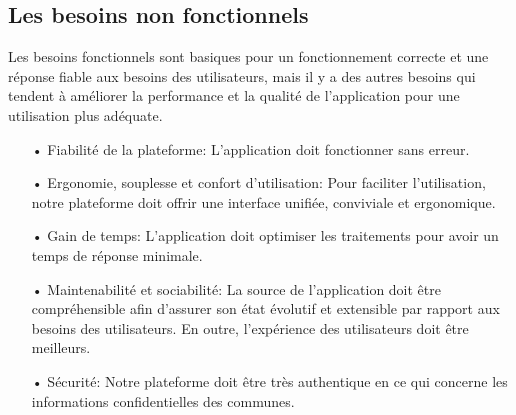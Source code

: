 \documentclass[a4paper]{report}
\begin{document}
\begin{doublespace}
	\subsection{Les besoins non fonctionnels}
	Les besoins fonctionnels sont basiques pour un fonctionnement
	correcte et une réponse fiable aux besoins des utilisateurs, mais il y a des
	autres besoins qui tendent à améliorer la performance et la qualité de
	l'application pour une utilisation plus adéquate.
	\begin{itemize}
		\item[•] Fiabilité de la plateforme: L’application doit
		      fonctionner sans erreur.
		\item[•] Ergonomie, souplesse et confort d’utilisation: Pour
		      faciliter l’utilisation, notre plateforme doit offrir une interface unifiée,
		      conviviale et ergonomique.
		\item[•] Gain de temps: L'application doit optimiser les
		      traitements pour avoir un temps de réponse minimale.
		\item[•] Maintenabilité et sociabilité: La source de l'application doit être compréhensible
		      afin d’assurer son état évolutif et extensible par rapport aux besoins des utilisateurs. En outre, l’expérience des utilisateurs doit être meilleurs.
		\item[•] Sécurité: Notre plateforme doit  être très authentique en ce qui concerne les informations confidentielles des communes.
	\end{itemize}

\end{doublespace}
\end{document}
